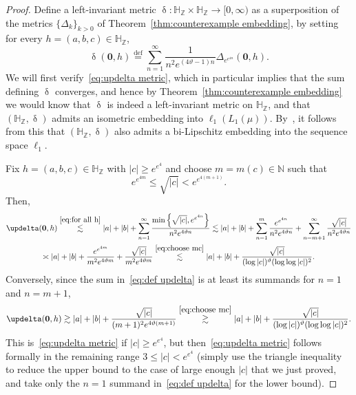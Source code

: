 \documentclass[11pt,reqno]{amsart}
\renewcommand{\H}{\mathbb{H}}
\newcommand{\N}{\mathbb{N}}
\newcommand{\Z}{\mathbb{Z}}
\newcommand{\0}{\mathbf{0}}
\renewcommand{\1}{\mathbf 1}
\newcommand{\from}{\colon}
\newcommand{\eqdef}{\stackrel{\mathrm{def}}{=}}
\renewcommand{\ge}{\geqslant}
\renewcommand{\le}{\leqslant}
\theoremstyle{remark}
\begin{document}
\begin{proof} Define a left-invariant metric $\updelta\from \H_\Z\times \H_\Z\to [0,\infty)$ as  a superposition of the metrics $\{\Delta_k\}_{k>0}$ of Theorem~\ref{thm:counterexample embedding}, by setting for every $h=(a,b,c)\in \H_\Z$,
\begin{equation}\label{eq:def updelta}
\updelta(\0,h)\eqdef \sum_{n=1}^\infty \frac{1}{n^2e^{(4\vartheta-1)n}} \Delta_{e^{e^{4n}}}(\0,h).
\end{equation}
We will first verify~\eqref{eq:updelta metric}, which in particular implies that the sum defining $\updelta$ converges, and hence by Theorem~\ref{thm:counterexample embedding} we would know  that $\updelta$ is indeed a left-invariant metric on $\H_\Z$, and that $(\H_\Z,\updelta)$  admits an isometric embedding into $\ell_1(L_1(\mu))$. By~\cite{Ost12}, it follows from this that  $(\H_\Z,\updelta)$ also admits a bi-Lipschitz embedding into the sequence space $\ell_1$.

Fix $h=(a,b,c)\in \H_\Z$ with $|c|\ge e^{e^4}$ and choose $m=m(c)\in \N$ such that
\begin{equation}\label{eq:choose mc}
e^{e^{4m}}\le \sqrt{|c|}<e^{e^{4(m+1)}}.
\end{equation}
 Then,
\begin{multline*}
\updelta(\0,h)\stackrel{\eqref{eq:for all h}}{\lesssim} |a|+|b|+\sum_{n=1}^\infty \frac{\min\left\{\sqrt{|c|},e^{e^{4n}}\right\}}{n^2e^{4\vartheta n}}\lesssim |a|+|b|+\sum_{n=1}^m \frac{e^{e^{4n}}}{n^2e^{4\vartheta n}} +\sum_{n=m+1}^\infty \frac{\sqrt{|c|}}{n^2e^{4\vartheta n}}\\
\asymp |a|+|b|+\frac{e^{e^{4m}}}{m^2e^{4\vartheta m}} +\frac{\sqrt{|c|}}{m^2e^{4\vartheta m}}\stackrel{\eqref{eq:choose mc}}{\lesssim} |a|+|b|+\frac{\sqrt{|c|}}{(\log |c|)^\vartheta (\log\log |c|)^2}.
\end{multline*}
Conversely, since the sum in~\eqref{eq:def updelta} is at least its summands for $n=1$ and $n=m+1$,
$$
\updelta(\0,h)\gtrsim |a|+|b|+\frac{\sqrt{|c|}}{(m+1)^2e^{4\vartheta (m+1)}}\stackrel{\eqref{eq:choose mc}}{\gtrsim} |a|+|b|+\frac{\sqrt{|c|}}{(\log |c|)^\vartheta (\log\log |c|)^2}.
$$
This is~\eqref{eq:updelta metric} if $|c|\ge e^{e^4}$, but then~\eqref{eq:updelta metric} follows formally in the remaining range  $3\le |c|<e^{e^4}$ (simply use  the triangle inequality to reduce  the upper bound to the case of large enough $|c|$ that we just proved, and take only the $n=1$ summand in~\eqref{eq:def updelta} for the lower bound).


\end{proof}
\end{document}
